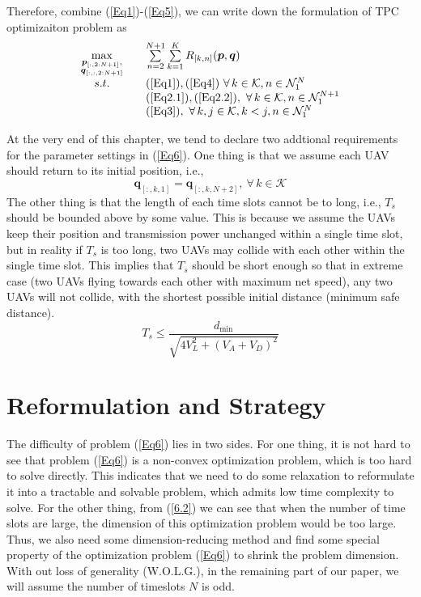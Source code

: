 \documentclass[10pt,final,conference]{IEEEtran}
\begin{document}
Therefore, combine (\ref{Eq1})-(\ref{Eq5}), we can write down the formulation of TPC optimizaiton problem as
\begin{equation}\label{Eq6}
\begin{array}{cll}
	\max\limits_{\substack{\boldsymbol{p}_{[:,2:N+1]},\\ \boldsymbol{q}_{[:,:,2:N+1]}}}\quad & \sum\limits_{n=2}^{N+1}\sum\limits_{k=1}^K R_{[k,n]}(\boldsymbol{p},\boldsymbol{q}) \\ 
	s.t. \quad & (\ref{Eq1}),(\ref{Eq4})\ \forall\,k\in\mathcal{K},n\in\mathcal{N}_1^N \\
	& (\ref{Eq2.1}),(\ref{Eq2.2}),\ \forall\,k\in\mathcal{K},n\in\mathcal{N}_1^{N+1} \\
	& (\ref{Eq3}),\ \forall\,k,j\in\mathcal{K},k<j,n\in\mathcal{N}_1^N
\end{array}
\end{equation}

At the very end of this chapter, we tend to declare two addtional requirements for the parameter settings in (\ref{Eq6}). One thing is that we assume each UAV should return to its initial position, i.e.,
\begin{equation}\label{6.1}
\boldsymbol{q}_{[:,k,1]} = \boldsymbol{q}_{[:,k,N+2]},\ \forall\,k\in\mathcal{K}\tag{6.1}
\end{equation}
The other thing is that the length of each time slots cannot be to long, i.e., $T_s$ should be bounded above by some value. This is because we assume the UAVs keep their position and transmission power unchanged within a single time slot, but in reality if $T_s$ is too long, two UAVs may collide with each other within the single time slot. This implies that $T_s$ should be short enough so that in extreme case (two UAVs flying towards each other with maximum net speed), any two UAVs will not collide, with the shortest possible initial distance (minimum safe distance).
\begin{equation}\label{6.2}
T_s \leq \frac{d_{\min}}{\sqrt{4V_L^2+(V_A+V_D)^2}}\tag{6.2}
\end{equation}
\baselineskip

\section{Reformulation and Strategy}\label{III}
The difficulty of problem (\ref{Eq6}) lies in two sides. For one thing, it is not hard to see that problem (\ref{Eq6}) is a non-convex optimization problem, which is too hard to solve directly. This indicates that we need to do some relaxation to reformulate it into a tractable and solvable problem, which admits low time complexity to solve. For the other thing, from (\ref{6.2}) we can see that when the number of time slots are large, the dimension of this optimization problem would be too large. Thus, we also need some dimension-reducing method and find some special property of the optimization problem (\ref{Eq6}) to shrink the problem dimension. With out loss of generality (W.O.L.G.), in the remaining part of our paper, we will assume the number of timeslots $N$ is odd.
\end{document}
